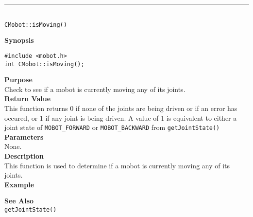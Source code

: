 \noindent
\vspace{5pt}
\rule{4.5in}{0.015in}\\
\noindent
{\LARGE \texttt{CMobot::isMoving()}}\\
{}

\noindent
{\bf Synopsis}
\vspace{-8pt}
\begin{verbatim}
#include <mobot.h>
int CMobot::isMoving();
\end{verbatim}

\noindent
{\bf Purpose}\\
Check to see if a mobot is currently moving any of its joints.\\

\noindent
{\bf Return Value}\\
This function returns 0 if none of the joints are being driven or if an error
has occured, or 1 if any joint is being driven. A value of 1 is equivalent to 
either a joint state of \texttt{MOBOT\_FORWARD} or \texttt{MOBOT\_BACKWARD} 
from \texttt{getJointState()}\\ 

\noindent
{\bf Parameters}\\
None.\\

\noindent
{\bf Description}\\
This function is used to determine if a mobot is currently moving any of
its joints. \\

\noindent
{\bf Example}\\
\noindent

\noindent
{\bf See Also}\\
\texttt{getJointState()}

